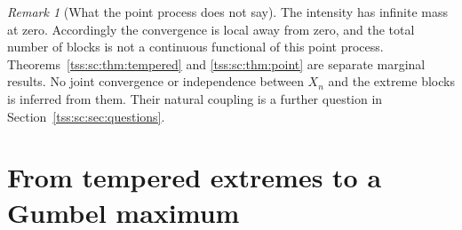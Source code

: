 \documentclass[11pt]{article}
\theoremstyle{remark}\newtheorem{remark}[theorem]{Remark}
\theoremstyle{definition}\newtheorem{definition}[theorem]{Definition}
\begin{document}
\begin{remark}[What the point process does not say]
The intensity has infinite mass at zero. Accordingly the convergence is local away from zero, and the total number of blocks is not a continuous functional of this point process. Theorems~\ref{tss:sc:thm:tempered} and \ref{tss:sc:thm:point} are separate marginal results. No joint convergence or independence between $X_n$ and the extreme blocks is inferred from them. Their natural coupling is a further question in Section~\ref{tss:sc:sec:questions}.
\end{remark}

\section{From tempered extremes to a Gumbel maximum}
\label{tss:sc:sec:gumbel}
\end{document}
